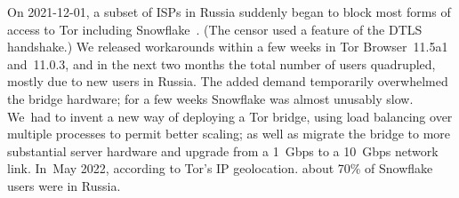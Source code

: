 \documentclass[letterpaper,twocolumn]{article}
\begin{document}
On \mbox{2021-12-01}, a subset of ISPs in Russia suddenly began to block
most forms of access to Tor
including Snowflake~\cite{ooni-2021-russia-blocks-tor}.
(The censor used a feature of the DTLS handshake.)
We released workarounds within a few weeks in
Tor Browser~11.5a1 and~11.0.3,
and in the next two months the total number of users quadrupled,
mostly due to new users in Russia.
The added demand temporarily overwhelmed the bridge hardware;
for a few weeks Snowflake was almost unusably slow.
We~had to invent a new way of deploying a Tor bridge,
using load balancing over multiple processes to permit better scaling;
as well as migrate the bridge to more substantial server hardware
and upgrade from a 1~Gbps to a 10~Gbps network link.
In~May 2022, according to Tor's IP geolocation.
about 70\% of Snowflake users were in Russia.
\end{document}
